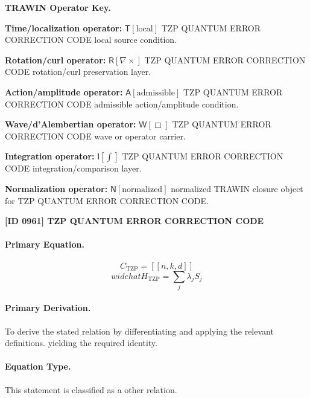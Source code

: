 \par\vspace{0.45\baselineskip}
\noindent\begin{minipage}[t]{\linewidth}
\begingroup
\small
\raggedright
\textbf{TRAWIN Operator Key.}\par
\noindent\textbf{Time/localization operator:} $\mathsf{T}\!\left[\mathrm{local}\right]$ TZP QUANTUM ERROR CORRECTION CODE local source condition.\par
\noindent\textbf{Rotation/curl operator:} $\mathsf{R}\!\left[\nabla\times\right]$ TZP QUANTUM ERROR CORRECTION CODE rotation/curl preservation layer.\par
\noindent\textbf{Action/amplitude operator:} $\mathsf{A}\!\left[\mathrm{admissible}\right]$ TZP QUANTUM ERROR CORRECTION CODE admissible action/amplitude condition.\par
\noindent\textbf{Wave/d'Alembertian operator:} $\mathsf{W}\!\left[\Box\right]$ TZP QUANTUM ERROR CORRECTION CODE wave or operator carrier.\par
\noindent\textbf{Integration operator:} $\mathsf{I}\!\left[\int\right]$ TZP QUANTUM ERROR CORRECTION CODE integration/comparison layer.\par
\noindent\textbf{Normalization operator:} $\mathsf{N}\!\left[\mathrm{normalized}\right]$ normalized TRAWIN closure object for TZP QUANTUM ERROR CORRECTION CODE.\par
\endgroup
\end{minipage}

\clearpage
\noindent\textbf{[ID 0961] TZP QUANTUM ERROR CORRECTION CODE}\par
\vspace{0.35em}
\paragraph{Primary Equation.}
\[
C_{\mathrm{TZP}}=[[n,k,d]]
\]
\[
widehat{H}_{\mathrm{TZP}}=\sum_j \lambda_j S_j
\]

\paragraph{Primary Derivation.}
To derive the stated relation by differentiating and applying the relevant definitions. yielding the required identity.
\paragraph{Equation Type.}
This statement is classified as a other relation.

